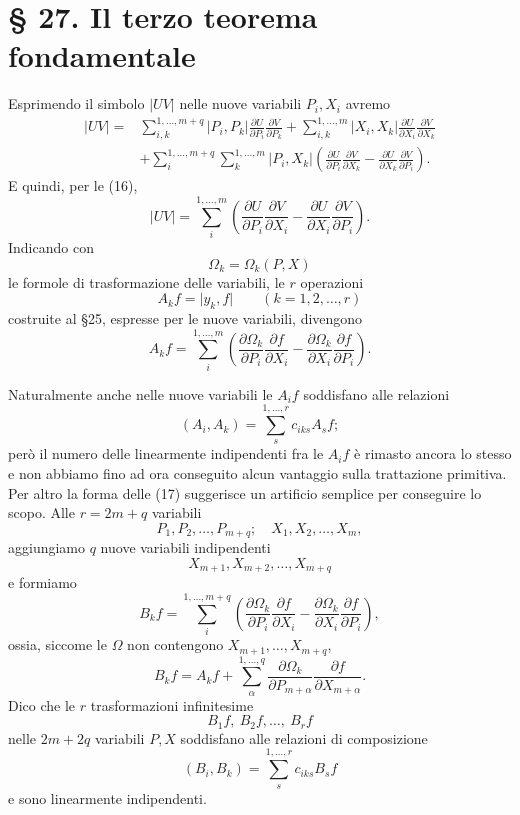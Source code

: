 \documentclass[11pt]{book}
\begin{document}
\section*{\S{} 27. Il terzo teorema fondamentale}

Esprimendo il simbolo $\lvert UV\rvert$ nelle nuove variabili $P_i,X_i$ avremo
\[
\begin{split}
\lvert UV\rvert={}&
 \sum\limits_{i,k}^{1,\ldots,m+q}\lvert P_i,P_k\rvert
        \frac{\partial U}{\partial P_i}\frac{\partial V}{\partial P_k}
 +\sum\limits_{i,k}^{1,\ldots,m}\lvert X_i,X_k\rvert
        \frac{\partial U}{\partial X_i}\frac{\partial V}{\partial X_k}        \\
&+\sum\limits_i^{1,\ldots,m+q}\sum\limits_k^{1,\ldots,m}
 \lvert P_i,X_k\rvert
 \left(
  \frac{\partial U}{\partial P_i}\frac{\partial V}{\partial X_k}
 -\frac{\partial U}{\partial X_k}\frac{\partial V}{\partial P_i}
 \right).
\end{split}
\]
E quindi, per le (16),
\[
 \lvert UV\rvert=
 \sum\limits_i^{1,\ldots,m}
 \left(
  \frac{\partial U}{\partial P_i}\frac{\partial V}{\partial X_i}
 -\frac{\partial U}{\partial X_i}\frac{\partial V}{\partial P_i}
 \right).
\]
Indicando con
\[
 \Omega_k=\Omega_k(P,X)
\]
le formole di trasformazione delle variabili, le $r$ operazioni
\[
 A_k f=\lvert y_k,f\rvert\qquad (k=1,2,\ldots,r)
\]
costruite al \S{}25, espresse per le nuove variabili, divengono
\begin{equation*}\tag{17}
 A_kf=\sum\limits_i^{1,\ldots,m}
 \left(
  \frac{\partial\Omega_k}{\partial P_i}\frac{\partial f}{\partial X_i}
 -\frac{\partial\Omega_k}{\partial X_i}\frac{\partial f}{\partial P_i}
 \right).
\end{equation*}

Naturalmente anche nelle nuove variabili le $A_i f$ soddisfano alle relazioni
\[
 (A_i,A_k)=\sum\limits_s^{1,\ldots,r} c_{iks}A_s f;
\]
però il numero delle linearmente indipendenti fra le $A_i f$ è rimasto ancora lo stesso e non abbiamo fino ad ora conseguito alcun vantaggio sulla trattazione primitiva. Per altro la forma delle (17) suggerisce un artificio semplice per conseguire lo scopo. Alle $r=2m+q$ variabili
\[
 P_1,P_2,\ldots,P_{m+q};\quad X_1,X_2,\ldots,X_m,
\]
aggiungiamo $q$ nuove variabili indipendenti
\[
 X_{m+1},X_{m+2},\ldots,X_{m+q}
\]
e formiamo
\begin{equation*}\tag{18}
 B_k f=\sum\limits_i^{1,\ldots,m+q}
 \left(
  \frac{\partial\Omega_k}{\partial P_i}\frac{\partial f}{\partial X_i}
 -\frac{\partial\Omega_k}{\partial X_i}\frac{\partial f}{\partial P_i}
 \right),
\end{equation*}
ossia, siccome le $\Omega$ non contengono $X_{m+1},\ldots,X_{m+q}$,
\begin{equation*}\tag{18*}
 B_k f=A_k f+\sum\limits_{\alpha}^{1,\ldots,q}
 \frac{\partial\Omega_k}{\partial P_{m+\alpha}}
 \frac{\partial f}{\partial X_{m+\alpha}}.
\end{equation*}
Dico che le $r$ trasformazioni infinitesime
\[
 B_1f,\ B_2f,\ldots,\ B_rf
\]
nelle $2m+2q$ variabili $P,X$ soddisfano alle relazioni di composizione
\[
 (B_i,B_k)=\sum\limits_s^{1,\ldots,r} c_{iks}B_sf
\]
e sono linearmente indipendenti.
\end{document}
